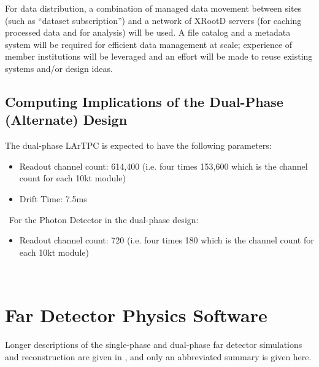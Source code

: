 For data distribution, a combination of managed data movement between sites (such as ``dataset subscription'')
and a network of XRootD servers (for caching processed data and for analysis) will be used.
A file catalog and a metadata system will be required for efficient data management at scale; %
experience of
member institutions will be leveraged and %
an effort will be made to reuse existing systems and/or design ideas. %

\subsection{Computing Implications of the Dual-Phase (Alternate) Design}
\label{sec:detectors-sc-alternate}
The dual-phase LArTPC is expected to have the following parameters:
\begin{itemize}
	\item Readout channel count: 614,400 (i.e. four times 153,600 which is the channel count
	for each 10kt module)
	\item Drift Time: 7.5ms
\end{itemize}
\
For the Photon Detector in the dual-phase design:
\begin{itemize}
	\item Readout channel count: 720 (i.e. four times 180 which is the channel count
	for each 10kt module)
\end{itemize}
\


\section{Far Detector Physics Software}
\label{sec:detectors-sc-physics-software}

Longer descriptions of the single-phase and dual-phase far detector simulations and reconstruction are given
in \anxreco, and only an abbreviated summary is given here.


